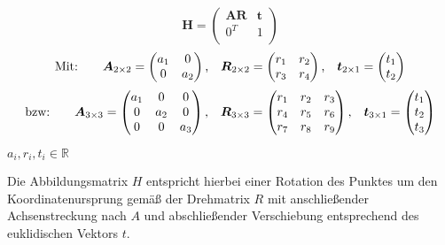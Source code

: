 \begin{equation}
	\boldsymbol{H} = \begin{pmatrix}\boldsymbol{A}\boldsymbol{R}&\boldsymbol{t}\\0^{T}&1\\\end{pmatrix}
\end{equation}
\begin{align*}
\text{Mit:\qquad} \boldsymbol{A}_{2{\times}2}=\begin{pmatrix}a_{1}&0\\0&a_{2}\\\end{pmatrix} \text{,\quad} \boldsymbol{R}_{2{\times}2}=\begin{pmatrix}r_{1}&r_{2}\\r_{3}&r_{4}\\\end{pmatrix} \text{,\quad} \boldsymbol{t}_{2{\times}1}=\begin{pmatrix}t_{1}\\t_{2}\\\end{pmatrix}
\end{align*}
\begin{align*}
\text{bzw:\qquad} \boldsymbol{A}_{3{\times}3}=\begin{pmatrix}a_{1}&0&0\\0&a_{2}&0\\0&0&a_{3}\\\end{pmatrix} \text{,\quad} \boldsymbol{R}_{3{\times}3}=\begin{pmatrix}r_{1}&r_{2}&r_{3}\\r_{4}&r_{5}&r_{6}\\r_{7}&r_{8}&r_{9}\\\end{pmatrix} \text{,\quad} \boldsymbol{t}_{3{\times}1}=\begin{pmatrix}t_{1}\\t_{2}\\t_{3}\\\end{pmatrix}
\end{align*}\begin{center}
$a_i, r_i, t_i \in \mathbb{R}$
\end{center}
Die Abbildungsmatrix $H$ entspricht hierbei einer Rotation des Punktes um den Koordinatenursprung gemäß der Drehmatrix $R$ mit anschließender Achsenstreckung nach $A$ und abschließender Verschiebung entsprechend des euklidischen Vektors $t$.\kleinerabstand

